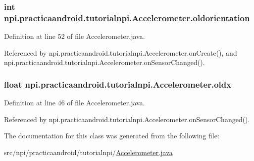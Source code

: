 \hypertarget{classnpi_1_1practicaandroid_1_1tutorialnpi_1_1_accelerometer_aa60b6921ce35928d28da993573e001d3}{
\subsubsection[{oldorientation}]{\setlength{\rightskip}{0pt plus 5cm}int npi.\-practicaandroid.\-tutorialnpi.\-Accelerometer.\-oldorientation\hspace{0.3cm}{\ttfamily [private]}}}\label{classnpi_1_1practicaandroid_1_1tutorialnpi_1_1_accelerometer_aa60b6921ce35928d28da993573e001d3}


Definition at line 52 of file Accelerometer.\-java.



Referenced by npi.\-practicaandroid.\-tutorialnpi.\-Accelerometer.\-on\-Create(), and npi.\-practicaandroid.\-tutorialnpi.\-Accelerometer.\-on\-Sensor\-Changed().

\hypertarget{classnpi_1_1practicaandroid_1_1tutorialnpi_1_1_accelerometer_adeab08257cb4a687507a01ed9f4a38b6}{
\subsubsection[{oldx}]{\setlength{\rightskip}{0pt plus 5cm}float npi.\-practicaandroid.\-tutorialnpi.\-Accelerometer.\-oldx\hspace{0.3cm}{\ttfamily [private]}}}\label{classnpi_1_1practicaandroid_1_1tutorialnpi_1_1_accelerometer_adeab08257cb4a687507a01ed9f4a38b6}


Definition at line 46 of file Accelerometer.\-java.



Referenced by npi.\-practicaandroid.\-tutorialnpi.\-Accelerometer.\-on\-Sensor\-Changed().



The documentation for this class was generated from the following file\-:\begin{DoxyCompactItemize}
\item 
src/npi/practicaandroid/tutorialnpi/\hyperlink{_accelerometer_8java}{Accelerometer.\-java}\end{DoxyCompactItemize}
